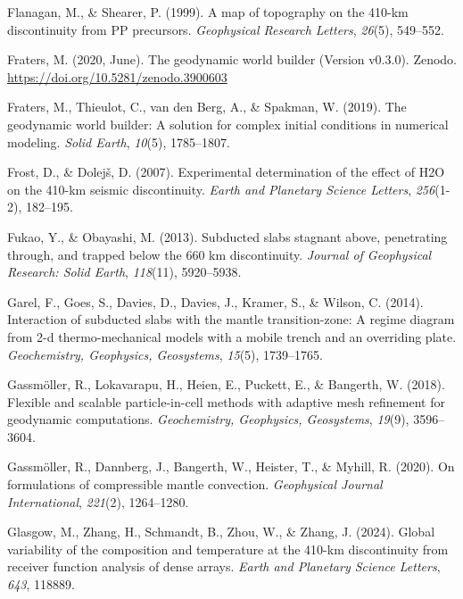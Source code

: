 \documentclass[draft,linenumbers]{agujournal2019}
\newlength{\cslhangindent}
\newenvironment{CSLReferences}[2]
 {\begin{list}{}{
  \setlength{\itemindent}{0pt}
  \setlength{\leftmargin}{0pt}
  \setlength{\parsep}{0pt}
  \ifodd #1
   \setlength{\leftmargin}{\cslhangindent}
   \setlength{\itemindent}{-\cslhangindent}
  \fi
  \setlength{\itemsep}{#2\baselineskip}
  }
  \item\relax}
 {\end{list}}
\begin{document}
\begin{CSLReferences}{1}{0}
Flanagan, M., \& Shearer, P. (1999). A map of topography on the 410-km
discontinuity from PP precursors. \emph{Geophysical Research Letters},
\emph{26}(5), 549--552.

Fraters, M. (2020, June). The geodynamic world builder (Version v0.3.0).
Zenodo. \url{https://doi.org/10.5281/zenodo.3900603}

{Fraters, M., Thieulot, C., van den Berg, A., \& Spakman, W.} (2019).
The geodynamic world builder: A solution for complex initial conditions
in numerical modeling. \emph{Solid Earth}, \emph{10}(5), 1785--1807.

Frost, D., \& Dolejš, D. (2007). Experimental determination of the
effect of H2O on the 410-km seismic discontinuity. \emph{Earth and
Planetary Science Letters}, \emph{256}(1-2), 182--195.

Fukao, Y., \& Obayashi, M. (2013). Subducted slabs stagnant above,
penetrating through, and trapped below the 660 km discontinuity.
\emph{Journal of Geophysical Research: Solid Earth}, \emph{118}(11),
5920--5938.

Garel, F., Goes, S., Davies, D., Davies, J., Kramer, S., \& Wilson, C.
(2014). Interaction of subducted slabs with the mantle transition-zone:
A regime diagram from 2-d thermo-mechanical models with a mobile trench
and an overriding plate. \emph{Geochemistry, Geophysics, Geosystems},
\emph{15}(5), 1739--1765.

Gassmöller, R., Lokavarapu, H., Heien, E., Puckett, E., \& Bangerth, W.
(2018). Flexible and scalable particle-in-cell methods with adaptive
mesh refinement for geodynamic computations. \emph{Geochemistry,
Geophysics, Geosystems}, \emph{19}(9), 3596--3604.

Gassmöller, R., Dannberg, J., Bangerth, W., Heister, T., \& Myhill, R.
(2020). On formulations of compressible mantle convection.
\emph{Geophysical Journal International}, \emph{221}(2), 1264--1280.

Glasgow, M., Zhang, H., Schmandt, B., Zhou, W., \& Zhang, J. (2024).
Global variability of the composition and temperature at the 410-km
discontinuity from receiver function analysis of dense arrays.
\emph{Earth and Planetary Science Letters}, \emph{643}, 118889.


\end{CSLReferences}
\end{document}
